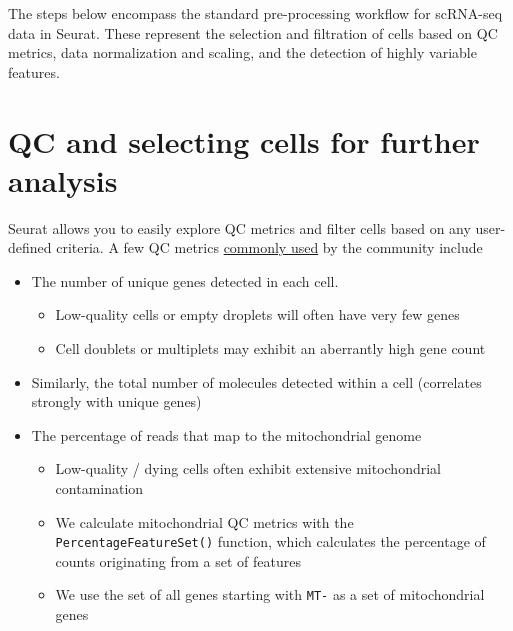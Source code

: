 \documentclass[
]{book}
\newenvironment{Shaded}{\begin{snugshade}}{\end{snugshade}}
\newcommand{\AttributeTok}[1]{\textcolor[rgb]{0.13,0.29,0.53}{#1}}
\newcommand{\CommentTok}[1]{\textcolor[rgb]{0.56,0.35,0.01}{\textit{#1}}}
\newcommand{\FunctionTok}[1]{\textcolor[rgb]{0.13,0.29,0.53}{\textbf{#1}}}
\newcommand{\NormalTok}[1]{#1}
\newcommand{\OtherTok}[1]{\textcolor[rgb]{0.56,0.35,0.01}{#1}}
\newcommand{\SpecialCharTok}[1]{\textcolor[rgb]{0.81,0.36,0.00}{\textbf{#1}}}
\newcommand{\StringTok}[1]{\textcolor[rgb]{0.31,0.60,0.02}{#1}}
\providecommand{\tightlist}{%
  \setlength{\itemsep}{0pt}\setlength{\parskip}{0pt}}
\begin{document}
The steps below encompass the standard pre-processing workflow for scRNA-seq data in Seurat. These represent the selection and filtration of cells based on QC metrics, data normalization and scaling, and the detection of highly variable features.

\hypertarget{qc-and-selecting-cells-for-further-analysis}{%
\section{QC and selecting cells for further analysis}\label{qc-and-selecting-cells-for-further-analysis}}

Seurat allows you to easily explore QC metrics and filter cells based on any user-defined criteria. A few QC metrics \href{https://www.ncbi.nlm.nih.gov/pmc/articles/PMC4758103/}{commonly used} by the community include

\begin{itemize}
\tightlist
\item
  The number of unique genes detected in each cell.

  \begin{itemize}
  \tightlist
  \item
    Low-quality cells or empty droplets will often have very few genes
  \item
    Cell doublets or multiplets may exhibit an aberrantly high gene count
  \end{itemize}
\item
  Similarly, the total number of molecules detected within a cell (correlates strongly with unique genes)
\item
  The percentage of reads that map to the mitochondrial genome

  \begin{itemize}
  \tightlist
  \item
    Low-quality / dying cells often exhibit extensive mitochondrial contamination
  \item
    We calculate mitochondrial QC metrics with the \texttt{PercentageFeatureSet()} function, which calculates the percentage of counts originating from a set of features
  \item
    We use the set of all genes starting with \texttt{MT-} as a set of mitochondrial genes
  \end{itemize}
\end{itemize}

\begin{Shaded}
\end{Shaded}
\end{document}
